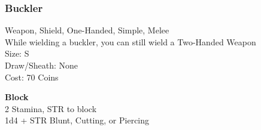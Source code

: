 \subsubsection{Buckler}\label{weapon:buckler}
Weapon, Shield, One-Handed, Simple, Melee\\
While wielding a buckler, you can still wield a Two-Handed Weapon\\
Size: S\\
Draw/Sheath: None\\
Cost: 70 Coins

\textbf{Block}\\
2 Stamina, STR to block\\
1d4 + \texttimes STR Blunt, Cutting, or Piercing

